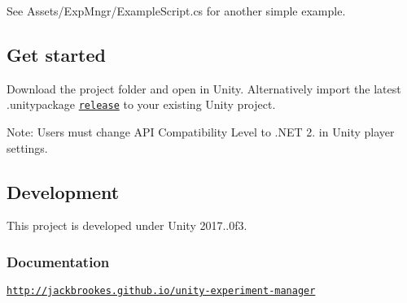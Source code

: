 See {\ttfamily Assets/\+Exp\+Mngr/\+Example\+Script.\+cs} for another simple example.

\subsection*{Get started}

Download the project folder and open in Unity. Alternatively import the latest {\ttfamily .unitypackage} \href{https://github.com/jackbrookes/unity-experiment-manager/releases}{\tt release} to your existing Unity project.

Note\+: Users must change A\+PI Compatibility Level to .N\+ET 2. in Unity player settings.

\subsection*{Development}

This project is developed under Unity 2017..\+0f3.

\subsubsection*{Documentation}

\href{http://jackbrookes.github.io/unity-experiment-manager}{\tt http\+://jackbrookes.\+github.\+io/unity-\/experiment-\/manager} 